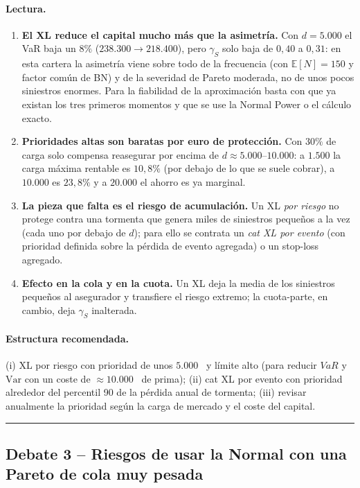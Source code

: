 \documentclass[a4paper,12pt]{article}
\newcommand{\euro}{\texteuro}
\newcommand{\E}{\mathbb{E}}
\newcommand{\Var}{\mathrm{Var}}
\begin{document}
\paragraph{Lectura.}
\begin{enumerate}[leftmargin=*,itemsep=2pt]
\item \textbf{El XL reduce el capital mucho m\'as que la asimetr\'ia.} Con $d=5.000$ el VaR baja un $8\%$ ($238.300\to218.400$), pero $\gamma_S$ solo baja de $0{,}40$ a $0{,}31$: en esta cartera la asimetr\'ia viene sobre todo de la frecuencia (con $\E[N]=150$ y factor com\'un de BN) y de la severidad de Pareto moderada, no de unos pocos siniestros enormes. Para la fiabilidad de la aproximaci\'on basta con que ya existan los tres primeros momentos y que se use la Normal Power o el c\'alculo exacto.
\item \textbf{Prioridades altas son baratas por euro de protecci\'on.} Con $30\%$ de carga solo compensa reasegurar por encima de $d\approx5.000$--$10.000$: a $1.500$ la carga m\'axima rentable es $10{,}8\%$ (por debajo de lo que se suele cobrar), a $10.000$ es $23{,}8\%$ y a $20.000$ el ahorro es ya marginal.
\item \textbf{La pieza que falta es el riesgo de acumulaci\'on.} Un XL \emph{por riesgo} no protege contra una tormenta que genera miles de siniestros peque\~nos a la vez (cada uno por debajo de $d$); para ello se contrata un \emph{cat XL por evento} (con prioridad definida sobre la p\'erdida de evento agregada) o un stop-loss agregado.
\item \textbf{Efecto en la cola y en la cuota.} Un XL deja la media de los siniestros peque\~nos al asegurador y transfiere el riesgo extremo; la cuota-parte, en cambio, deja $\gamma_S$ inalterada.
\end{enumerate}

\paragraph{Estructura recomendada.} (i) XL por riesgo con prioridad de unos $5.000$ \euro\ y l\'imite alto (para reducir $VaR$ y $\Var$ con un coste de $\approx10.000$ \euro\ de prima); (ii) cat XL por evento con prioridad alrededor del percentil 90 de la p\'erdida anual de tormenta; (iii) revisar anualmente la prioridad seg\'un la carga de mercado y el coste del capital.

\bigskip\hrule\bigskip

\subsection{Debate 3 -- Riesgos de usar la Normal con una Pareto de cola muy pesada}
\end{document}
